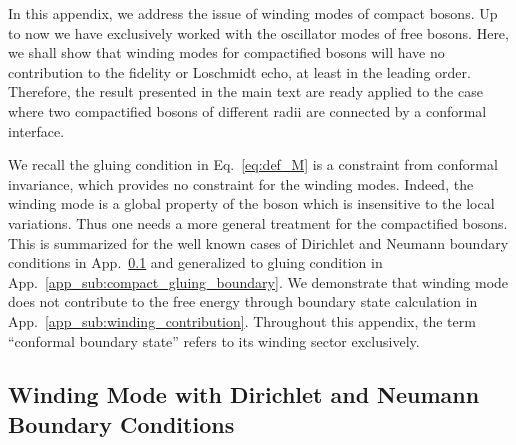 In this appendix, we address the issue of winding modes of compact bosons. Up to now we have exclusively worked with the oscillator modes of free bosons. 
Here, we shall show that winding modes for compactified bosons will have no contribution to the fidelity or Loschmidt echo, at least in the leading order. Therefore, the result presented in the main text are ready applied to the case where two compactified bosons of different radii are connected by a conformal interface. 

We recall the gluing condition in Eq.~\eqref{eq:def_M} is a constraint from conformal invariance\cite{blumenhagen_introduction_2009,bachas_permeable_2002}, which provides no constraint for the winding modes. Indeed, the winding mode is a global property of the boson which is insensitive to the local variations. Thus one needs a more general treatment for the compactified bosons. This is summarized for the well known cases of Dirichlet and Neumann boundary conditions in App.~\ref{app_sub:compact_DN_boundary} and generalized to gluing condition in App.~\ref{app_sub:compact_gluing_boundary}. We demonstrate that winding mode does not contribute to the free energy through boundary state calculation in App.~\ref{app_sub:winding_contribution}. Throughout this appendix, the term ``conformal boundary state'' refers to its winding sector exclusively.


\subsection{Winding Mode with Dirichlet and Neumann Boundary Conditions}
\label{app_sub:compact_DN_boundary}

